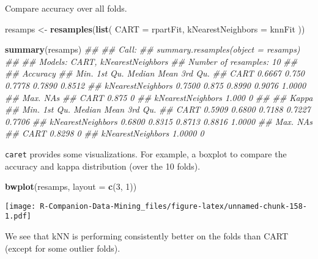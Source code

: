\documentclass[
  notitlepage]{book}
\newenvironment{Shaded}{\begin{snugshade}}{\end{snugshade}}
\newcommand{\CommentTok}[1]{\textcolor[rgb]{0.56,0.35,0.01}{\textit{#1}}}
\newcommand{\DataTypeTok}[1]{\textcolor[rgb]{0.13,0.29,0.53}{#1}}
\newcommand{\DecValTok}[1]{\textcolor[rgb]{0.00,0.00,0.81}{#1}}
\newcommand{\KeywordTok}[1]{\textcolor[rgb]{0.13,0.29,0.53}{\textbf{#1}}}
\newcommand{\NormalTok}[1]{#1}
\newcommand{\StringTok}[1]{\textcolor[rgb]{0.31,0.60,0.02}{#1}}
\begin{document}
Compare accuracy over all folds.

\begin{Shaded}
\begin{Highlighting}[]
\NormalTok{resamps \textless{}{-}}\StringTok{ }\KeywordTok{resamples}\NormalTok{(}\KeywordTok{list}\NormalTok{(}
        \DataTypeTok{CART =}\NormalTok{ rpartFit,}
        \DataTypeTok{kNearestNeighbors =}\NormalTok{ knnFit}
\NormalTok{        ))}

\KeywordTok{summary}\NormalTok{(resamps)}
\CommentTok{\#\# }
\CommentTok{\#\# Call:}
\CommentTok{\#\# summary.resamples(object = resamps)}
\CommentTok{\#\# }
\CommentTok{\#\# Models: CART, kNearestNeighbors }
\CommentTok{\#\# Number of resamples: 10 }
\CommentTok{\#\# }
\CommentTok{\#\# Accuracy }
\CommentTok{\#\#                     Min. 1st Qu. Median   Mean 3rd Qu.}
\CommentTok{\#\# CART              0.6667   0.750 0.7778 0.7890  0.8512}
\CommentTok{\#\# kNearestNeighbors 0.7500   0.875 0.8990 0.9076  1.0000}
\CommentTok{\#\#                    Max. NA\textquotesingle{}s}
\CommentTok{\#\# CART              0.875    0}
\CommentTok{\#\# kNearestNeighbors 1.000    0}
\CommentTok{\#\# }
\CommentTok{\#\# Kappa }
\CommentTok{\#\#                     Min. 1st Qu. Median   Mean 3rd Qu.}
\CommentTok{\#\# CART              0.5909  0.6800 0.7188 0.7227  0.7706}
\CommentTok{\#\# kNearestNeighbors 0.6800  0.8315 0.8713 0.8816  1.0000}
\CommentTok{\#\#                     Max. NA\textquotesingle{}s}
\CommentTok{\#\# CART              0.8298    0}
\CommentTok{\#\# kNearestNeighbors 1.0000    0}
\end{Highlighting}
\end{Shaded}

\texttt{caret} provides some visualizations. For
example, a boxplot to compare the accuracy and kappa distribution (over
the 10 folds).

\begin{Shaded}
\begin{Highlighting}[]
\KeywordTok{bwplot}\NormalTok{(resamps, }\DataTypeTok{layout =} \KeywordTok{c}\NormalTok{(}\DecValTok{3}\NormalTok{, }\DecValTok{1}\NormalTok{))}
\end{Highlighting}
\end{Shaded}

\texttt{[image: R-Companion-Data-Mining\_files/figure-latex/unnamed-chunk-158-1.pdf]}

We see that kNN is performing consistently better on the folds than CART
(except for some outlier folds).
\end{document}
